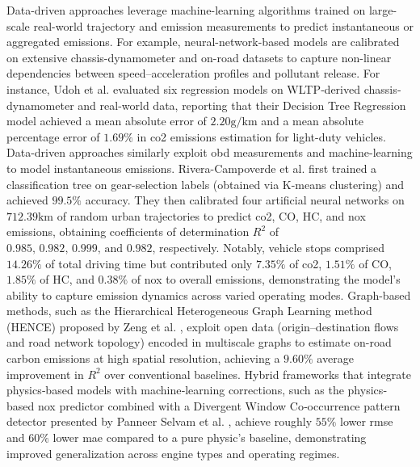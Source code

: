 Data-driven approaches leverage machine-learning algorithms trained on large-scale real-world trajectory and emission measurements to predict instantaneous or aggregated emissions. For example, neural-network-based models are calibrated on extensive chassis-dynamometer and on-road datasets to capture non-linear dependencies between speed–acceleration profiles and pollutant release. \cite{Madziel2023} For instance, Udoh et al. \cite{Udoh2024} evaluated six regression models on WLTP‐derived chassis‐dynamometer and real-world data, reporting that their Decision Tree Regression model achieved a mean absolute error of $2.20\unit{\gram\per\kilo\metre}$ and a mean absolute percentage error of $1.69\%$ in \ac{co2} emissions estimation for light-duty vehicles. Data-driven approaches similarly exploit \ac{obd} measurements and machine-learning to model instantaneous emissions. Rivera-Campoverde et al. \cite{Rivera2021} first trained a classification tree on gear-selection labels (obtained via K-means clustering) and achieved $99.5\%$ accuracy. They then calibrated four artificial neural networks on $712.39\unit{\kilo\metre}$ of random urban trajectories to predict \ac{co2}, CO, HC, and \ac{nox} emissions, obtaining coefficients of determination $R^2$ of $0.985,\,0.982,\,0.999,\,\text{and } 0.982$, respectively. Notably, vehicle stops comprised $14.26\%$ of total driving time but contributed only $7.35\%$ of \ac{co2}, $1.51\%$ of CO, $1.85\%$ of HC, and $0.38\%$ of \ac{nox} to overall emissions, demonstrating the model’s ability to capture emission dynamics across varied operating modes. Graph-based methods, such as the Hierarchical Heterogeneous Graph Learning method (HENCE) proposed by Zeng et al. \cite{Zeng2024}, exploit open data (origin–destination flows and road network topology) encoded in multiscale graphs to estimate on-road carbon emissions at high spatial resolution, achieving a $9.60\%$ average improvement in $R^2$ over conventional baselines. Hybrid frameworks that integrate physics‐based models with machine‐learning corrections, such as the physics‐based \ac{nox} predictor combined with a Divergent Window Co‐occurrence pattern detector presented by Panneer Selvam et al. \cite{Selvam2025}, achieve roughly $55\%$ lower \ac{rmse} and $60\%$ lower \ac{mae} compared to a pure physic's baseline, demonstrating improved generalization across engine types and operating regimes.
\mynewline
